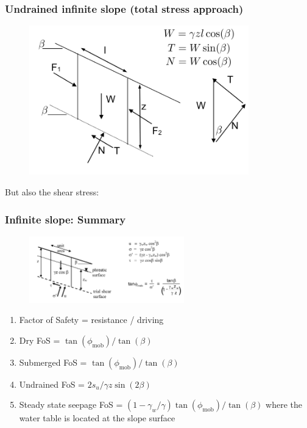 \documentclass[notes]{beamer}
\begin{document}

\begin{frame}
\frametitle{Undrained infinite slope (total stress approach)}
\begin{figure}[ht]
	\centering
	\includegraphics[width=0.85\textwidth]{figs/undrained-infinite-slope.png}
\end{figure}
But also the shear stress: 
\end{frame}


\begin{frame}
\frametitle{Infinite slope: Summary}
\begin{figure}[ht]
	\centering
	\includegraphics[width=0.6\textwidth]{figs/infinite-slope.png}
\end{figure}
\begin{enumerate}
	\item Factor of Safety = resistance / driving
	\item Dry FoS = $\tan(\phi_{\mathrm{mob}})/\tan(\beta)$
	\item Submerged FoS = $\tan(\phi_{\mathrm{mob}})/\tan(\beta)$
	\item Undrained FoS = $2 s_u / \gamma z \sin(2 \beta)$
	\item Steady state seepage FoS = $(1 - \gamma_w/ \gamma) \tan(\phi_{\mathrm{mob}})/\tan(\beta)$ where the water table is located at the slope surface
\end{enumerate}
\end{frame}
\end{document}
